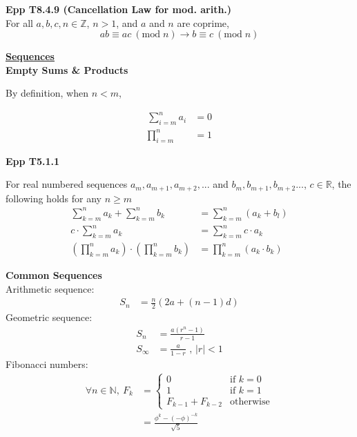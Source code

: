\documentclass[a4paper]{article}
\newcommand{\heading}[1]{{\small\underline{\textbf{#1}}}}
\newcommand{\subheading}[1]{{\scriptsize\textbf{#1}}}
\begin{document}
\begin{multicols*}{4}
\subheading{Epp T8.4.9 (Cancellation Law for mod. arith.)}\\
For all $a, b, c, n \in \mathbb{Z}$, $n>1$, and $a$ and $n$ are coprime,
$$ ab \equiv ac\ (\mathrm{mod}\;n) \rightarrow b \equiv c\ (\mathrm{mod}\;n) $$

\heading{Sequences}\\

\subheading{Empty Sums \& Products}

By definition, when $n < m$,

\begin{align*}
\sum^n_{i=m} a_i &= 0 \\
\prod^n_{i=m} &= 1
\end{align*}

\subheading{Epp T5.1.1}

For real numbered sequences $a_m, a_{m+1}, a_{m+2}, ...$ and $b_m, b_{m+1},
b_{m+2}...$, $c \in \mathbb{R}$, the following holds for any $n \geq m$
\begin{align*}
\sum^n_{k=m} a_k + \sum^n_{k=m} b_k &= \sum^n_{k=m}(a_k + b_l) \\
c \cdot \sum^n_{k=m} a_k &= \sum^n_{k=m} c \cdot a_k\\
\left ( \prod^n_{k=m} a_k \right ) \cdot \left ( \prod^n_{k=m} b_k \right ) &=
  \prod^n_{k=m}(a_k \cdot b_k)
\end{align*}

\vspace{0.3cm}

\subheading{Common Sequences}\\

Arithmetic sequence:
\begin{align*}
S_n &= \frac{n}{2} ( 2a + (n-1)d )
\end{align*}
Geometric sequence:
\begin{align*}
S_n &= \frac{a(r^n - 1)}{r - 1} \\
S_{\infty} &= \frac{a}{1-r}\text{ ,\ \ \ \ $|r| < 1$}
\end{align*}
Fibonacci numbers:
\begin{align*}
\forall n \in \mathbb{N},\ F_k &= \begin{cases}
  0 & \text{if $k=0$} \\
  1 & \text{if $k=1$} \\
  F_{k-1} + F_{k-2} & \text{otherwise}
\end{cases} \\
  &= \frac{\phi^k - (- \phi)^{-k}}{\sqrt{5}}
\end{align*}


\end{multicols*}
\end{document}
